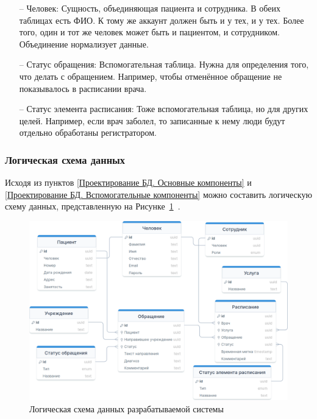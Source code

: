 \documentclass[a4paper,article]{article}
\begin{document}
\begin{sloppypar}
    \begin{itemize}[nolistsep]
        \item[--] Человек: Сущность, объединяющая пациента и сотрудника. В обеих таблицах есть ФИО. К тому же аккаунт должен быть и у тех, и у тех. Более того, один и тот же человек может быть и пациентом, и сотрудником. Объединение нормализует данные.
        \item[--] Статус обращения: Вспомогательная таблица. Нужна для определения того, что делать с обращением. Например, чтобы отменённое обращение не показывалось в расписании врача.
        \item[--] Статус элемента расписания: Тоже вспомогательная таблица, но для других целей. Например, если врач заболел, то записанные к нему люди будут отдельно обработаны регистратором.
    \end{itemize}

    \subsubsection{Логическая схема данных}

    Исходя из пунктов \ref{Проектирование БД. Основные компоненты} и \ref{Проектирование БД. Вспомогательные компоненты} можно составить логическую схему данных, представленную на Рисунке~\ref{fig:Логическая схема данных}~\cite{dbdiag}.

    \begin{figure}[h]
        \centering
        \includegraphics[width=0.9\linewidth]{Логическая схема данных.png}
        \caption{\centering Логическая схема данных разрабатываемой системы}
        \label{fig:Логическая схема данных}
    \end{figure}


\end{sloppypar}
\end{document}
